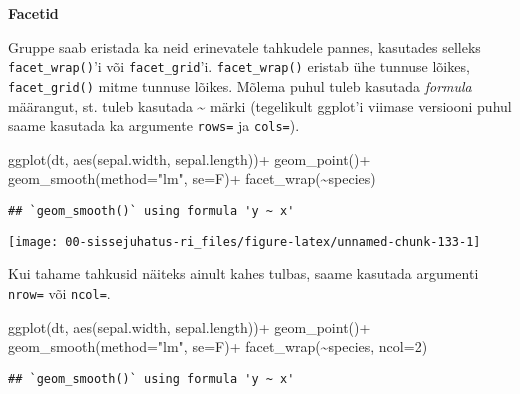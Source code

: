 \documentclass[
]{book}
\newenvironment{Shaded}{\begin{snugshade}}{\end{snugshade}}
\newcommand{\AttributeTok}[1]{\textcolor[rgb]{0.77,0.63,0.00}{#1}}
\newcommand{\DecValTok}[1]{\textcolor[rgb]{0.00,0.00,0.81}{#1}}
\newcommand{\FunctionTok}[1]{\textcolor[rgb]{0.00,0.00,0.00}{#1}}
\newcommand{\NormalTok}[1]{#1}
\newcommand{\SpecialCharTok}[1]{\textcolor[rgb]{0.00,0.00,0.00}{#1}}
\newcommand{\StringTok}[1]{\textcolor[rgb]{0.31,0.60,0.02}{#1}}
\begin{document}
\textbf{Facetid}

Gruppe saab eristada ka neid erinevatele tahkudele pannes, kasutades selleks \texttt{facet\_wrap()}'i või \texttt{facet\_grid}'i. \texttt{facet\_wrap()} eristab ühe tunnuse lõikes, \texttt{facet\_grid()} mitme tunnuse lõikes. Mõlema puhul tuleb kasutada \emph{formula} määrangut, st. tuleb kasutada \textasciitilde{} märki (tegelikult ggplot'i viimase versiooni puhul saame kasutada ka argumente \texttt{rows=} ja \texttt{cols=}).

\begin{Shaded}
\begin{Highlighting}[]
\FunctionTok{ggplot}\NormalTok{(dt, }\FunctionTok{aes}\NormalTok{(sepal.width, sepal.length))}\SpecialCharTok{+}
  \FunctionTok{geom\_point}\NormalTok{()}\SpecialCharTok{+}
  \FunctionTok{geom\_smooth}\NormalTok{(}\AttributeTok{method=}\StringTok{"lm"}\NormalTok{, }\AttributeTok{se=}\NormalTok{F)}\SpecialCharTok{+}
  \FunctionTok{facet\_wrap}\NormalTok{(}\SpecialCharTok{\textasciitilde{}}\NormalTok{species)}
\end{Highlighting}
\end{Shaded}

\begin{verbatim}
## `geom_smooth()` using formula 'y ~ x'
\end{verbatim}

\begin{center}\texttt{[image: 00-sissejuhatus-ri\_files/figure-latex/unnamed-chunk-133-1]} \end{center}

Kui tahame tahkusid näiteks ainult kahes tulbas, saame kasutada argumenti \texttt{nrow=} või \texttt{ncol=}.

\begin{Shaded}
\begin{Highlighting}[]
\FunctionTok{ggplot}\NormalTok{(dt, }\FunctionTok{aes}\NormalTok{(sepal.width, sepal.length))}\SpecialCharTok{+}
  \FunctionTok{geom\_point}\NormalTok{()}\SpecialCharTok{+}
  \FunctionTok{geom\_smooth}\NormalTok{(}\AttributeTok{method=}\StringTok{"lm"}\NormalTok{, }\AttributeTok{se=}\NormalTok{F)}\SpecialCharTok{+}
  \FunctionTok{facet\_wrap}\NormalTok{(}\SpecialCharTok{\textasciitilde{}}\NormalTok{species, }\AttributeTok{ncol=}\DecValTok{2}\NormalTok{)}
\end{Highlighting}
\end{Shaded}

\begin{verbatim}
## `geom_smooth()` using formula 'y ~ x'
\end{verbatim}
\end{document}

